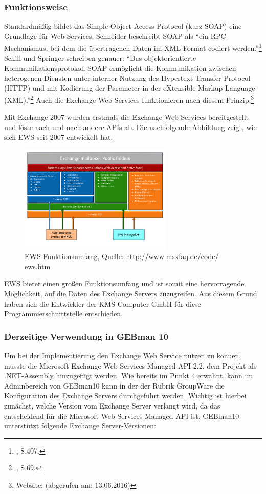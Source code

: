\subsubsection{Funktionsweise}
\noindent
Standardmäßig bildet das Simple Object Access Protocol (kurz SOAP) eine Grundlage für Web-Services. Schneider beschreibt SOAP als \enquote{ein RPC-Mechanismus, bei dem die übertragenen Daten im XML-Format codiert werden.}\footnote{\citeauthor{Schneider} \citeyear{Schneider}, S.407.}
Schill und Springer schreiben genauer: \enquote{Das objektorientierte Kommunikationsprotokoll SOAP ermöglicht die Kommunikation zwischen heterogenen Diensten unter interner Nutzung
des Hypertext Transfer Protocol (HTTP) und mit Kodierung der Parameter in der eXtensible Markup Language (XML).}\footnote{\citeauthor{Schill} \citeyear{Schill}, S.69.}
Auch die Exchange Web Services funktionieren nach diesem Prinzip.\footnote{Website: \citeauthor{MicrosoftSDK} (abgerufen am: 13.06.2016)}
 
\noindent
Mit Exchange 2007 wurden erstmals die Exchange Web Services  bereitgestellt und löste nach und nach andere APIs ab. Die nachfolgende Abbildung zeigt, wie sich EWS seit 2007 entwickelt hat.

\begin{figure}[h!]
\centering
\includegraphics[width=0.65\textwidth]{Abbildungen/EWS_Funktionsumfang.pdf}
	\caption[EWS Funktionsumfang]{EWS Funktionsumfang, Quelle: http://www.msxfaq.de/code/
	ews.htm}
	\label{fig:EWS_Funktionsumfang}
\end{figure}

\noindent
EWS bietet einen großen Funktionsumfang und ist somit eine hervorragende Möglichkeit, auf die Daten des Exchange Servers zuzugreifen. Aus diesem Grund haben sich die Entwickler der KMS Computer GmbH für diese Programmierschnittstelle entschieden.

\subsubsection{Derzeitige Verwendung in GEBman 10}
\noindent
Um bei der Implementierung den Exchange Web Service nutzen zu können, musste die Microsoft Exchange Web Services Managed API 2.2. dem Projekt als .NET-Assembly hinzugefügt werden. Wie bereits im Punkt 4 erwähnt, kann im Adminbereich von GEBman10 kann in der der Rubrik GroupWare die Konfiguration des Exchange Servers durchgeführt werden. Wichtig ist hierbei zunächst, welche Version vom Exchange Server verlangt wird, da das entscheidend für die Microsoft Web Services Managed API ist. GEBman10 unterstützt folgende Exchange Server-Versionen:

